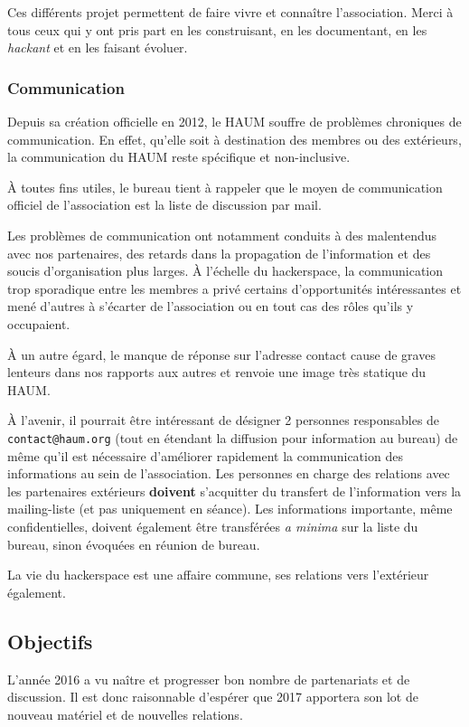 \documentclass[11pt]{article}
\begin{document}
Ces différents projet permettent de faire vivre et connaître l'association. Merci à tous ceux qui y ont pris part en les construisant, en les documentant, en les \textit{hackant} et en les faisant évoluer.

\subsubsection{Communication}

Depuis sa création officielle en 2012, le HAUM souffre de problèmes chroniques de communication. En effet, qu'elle soit à destination des membres ou des extérieurs, la communication du HAUM reste spécifique et non-inclusive.

À toutes fins utiles, le bureau tient à rappeler que le moyen de communication officiel de l'association est la liste de discussion par mail.

Les problèmes de communication ont notamment conduits à des malentendus avec nos partenaires, des retards dans la propagation de l'information et des soucis d'organisation plus larges. À l'échelle du hackerspace, la communication trop sporadique entre les membres a privé certains d'opportunités intéressantes et mené d'autres à s'écarter de l'association ou en tout cas des rôles qu'ils y occupaient.

À un autre égard, le manque de réponse sur l'adresse contact cause de graves lenteurs dans nos rapports aux autres et renvoie une image très statique du HAUM.

À l'avenir, il pourrait être intéressant de désigner 2 personnes responsables de \texttt{contact@haum.org} (tout en étendant la diffusion pour information au bureau) de même qu'il est nécessaire d'améliorer rapidement la communication des informations au sein de l'association. Les personnes en charge des relations avec les partenaires extérieurs \textbf{doivent} s'acquitter du transfert de l'information vers la mailing-liste (et pas uniquement en séance). Les informations importante, même confidentielles, doivent également être transférées \textit{a minima} sur la liste du bureau, sinon évoquées en réunion de bureau.

La vie du hackerspace est une affaire commune, ses relations vers l'extérieur également.

\subsection{Objectifs}

L'année 2016 a vu naître et progresser bon nombre de partenariats et de discussion. Il est donc raisonnable d'espérer que 2017 apportera son lot de nouveau matériel et de nouvelles relations.
\end{document}
